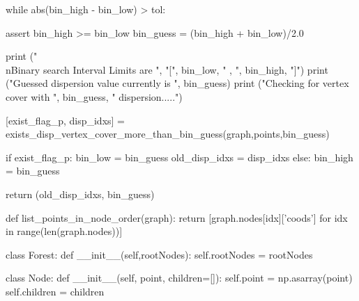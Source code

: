       while abs(bin_high - bin_low) > tol:

          assert bin_high >= bin_low 
          bin_guess = (bin_high + bin_low)/2.0
          
          print ("\\nBinary search Interval Limits are ", "[", bin_low, " , ", bin_high, "]")
          print ("Guessed dispersion value currently is ", bin_guess)
          print ("Checking for vertex cover with ", bin_guess, " dispersion.....")

          [exist_flag_p, disp_idxs] = exists_disp_vertex_cover_more_than_bin_guess(graph,points,bin_guess)

          if exist_flag_p:
                bin_low       = bin_guess
                old_disp_idxs = disp_idxs
          else:
                bin_high = bin_guess 

      return (old_disp_idxs, bin_guess)
\nwendcode{}\nwdocspar



\nwenddocs{}\plusendmoddef\nwstartdeflinemarkup{}\nwenddeflinemarkup
def list_points_in_node_order(graph):
     return [graph.nodes[idx]['coods'] for idx in range(len(graph.nodes))]
\nwendcode{}\nwdocspar


\nwenddocs{}\plusendmoddef\nwstartdeflinemarkup{}\nwenddeflinemarkup
class Forest:
    def __init__(self,rootNodes):
         self.rootNodes = rootNodes

class Node:
    def __init__(self, point, children=[]):
          self.point    = np.asarray(point)
          self.children = children
\nwendcode{}\nwdocspar


